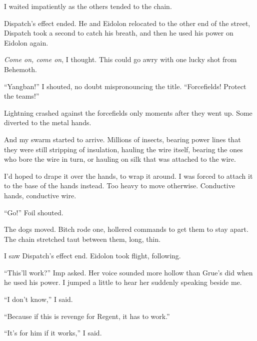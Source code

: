 I waited impatiently as the others tended to the chain.



Dispatch's effect ended.  He and Eidolon relocated to the other end of the street, Dispatch took a second to catch his breath, and then he used his power on Eidolon again.



\emph{Come on, come on}, I thought.  This could go awry with one lucky shot from Behemoth.



``Yangban!'' I shouted, no doubt mispronouncing the title.  ``Forcefields!  Protect the teams!''



Lightning crashed against the forcefields only moments after they went up.  Some diverted to the metal hands.



And my swarm started to arrive.  Millions of insects, bearing power lines that they were still stripping of insulation, hauling the wire itself, bearing the ones who bore the wire in turn, or hauling on silk that was attached to the wire.



I'd hoped to drape it over the hands, to wrap it around.  I was forced to attach it to the base of the hands instead.  Too heavy to move otherwise.  Conductive hands, conductive wire.



``Go!'' Foil shouted.



The dogs moved.  Bitch rode one, hollered commands to get them to stay apart.  The chain stretched taut between them, long, thin.



I saw Dispatch's effect end.  Eidolon took flight, following.



``This'll work?'' Imp asked.  Her voice sounded more hollow than Grue's did when he used his power.  I jumped a little to hear her suddenly speaking beside me.



``I don't know,'' I said.



``Because if this is revenge for Regent, it has to work.''



``It's for him if it works,'' I said.




